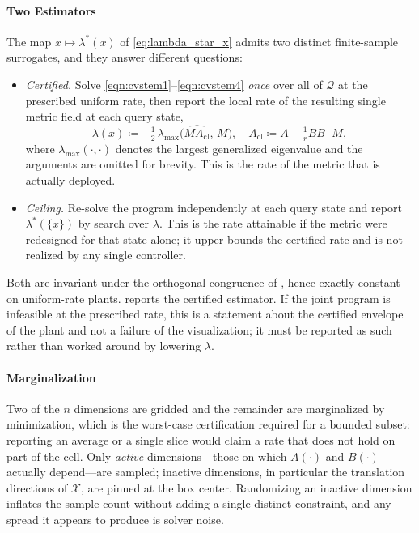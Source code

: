 \documentclass[lettersize,journal]{IEEEtran}
\begin{document}
\paragraph{Two Estimators}
The map $x\mapsto\lambda^*(x)$ of \eqref{eq:lambda_star_x} admits two distinct
finite-sample surrogates, and they answer different questions:
\begin{itemize}
    \item \emph{Certified.} Solve \eqref{eqn:cvstem1}--\eqref{eqn:cvstem4}
    \emph{once} over all of $\mathcal{Q}$ at the prescribed uniform rate, then
    report the local rate of the resulting single metric field at each query
    state,
    \begin{equation}\label{eqn:local_rate}
        \lambda(x) \coloneq
        -\tfrac{1}{2}\,\lambda_{\max}\!\bigl(\widehat{M A_{\mathrm{cl}}},\,M\bigr),
        \quad A_{\mathrm{cl}} \coloneq A - \tfrac{1}{r}BB^\top M,
    \end{equation}
    where $\lambda_{\max}(\cdot,\cdot)$ denotes the largest generalized
    eigenvalue and the arguments are omitted for brevity.
    This is the rate of the metric that is actually deployed.
    \item \emph{Ceiling.} Re-solve the program independently at each query state
    and report $\lambda^*(\{x\})$ by search over $\lambda$. This is the rate
    attainable if the metric were redesigned for that state alone; it upper
    bounds the certified rate and is not realized by any single controller.
\end{itemize}
Both are invariant under the orthogonal congruence of
, hence exactly constant on uniform-rate plants.
 reports the certified estimator. If the joint program is
infeasible at the prescribed rate, this is a statement about the certified
envelope of the plant and not a failure of the visualization; it must be
reported as such rather than worked around by lowering $\lambda$.

\paragraph{Marginalization}
Two of the $n$ dimensions are gridded and the remainder are marginalized by
minimization, which is the worst-case certification required for a bounded
subset: reporting an average or a single slice would claim a rate that does not
hold on part of the cell. Only \emph{active} dimensions---those on which
$A(\cdot)$ and $B(\cdot)$ actually depend---are sampled; inactive dimensions,
in particular the translation directions of $\mathcal{X}$, are pinned at the box
center. Randomizing an inactive dimension inflates the sample count without
adding a single distinct constraint, and any spread it appears to produce is
solver noise.
\end{document}
